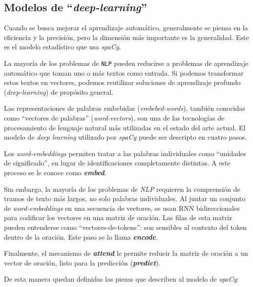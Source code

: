 \documentclass[12pt,a4paper,]{scrartcl}
\begin{document}
\hypertarget{modelos-de-deep-learning}{%
\subsection{\texorpdfstring{Modelos de \enquote{\emph{deep-learning}}}{Modelos de ``deep-learning''}}\label{modelos-de-deep-learning}}

Cuando se busca mejorar el aprendizaje automático, generalmente se piensa en la eficiencia y la precisión, pero la dimensión más importante es la generalidad. Este es el modelo estadístico que usa \emph{spaCy}.

La mayoría de los problemas de \texttt{NLP} pueden reducirse a problemas de aprendizaje automático que toman uno o más textos como entrada. Si podemos transformar estos textos en vectores, podemos reutilizar soluciones de aprendizaje profundo (\emph{deep-learning}) de propósito general.

Las representaciones de palabras embebidas (\emph{embebed-words}), también conocidas como \enquote{vectores de palabras} (\emph{word-vectors}), son una de las tecnologías de procesamiento de lenguaje natural más utilizadas en el estado del arte actual. El modelo de \emph{deep learning} utilizado por \emph{spaCy} puede ser descripto en cuatro pasos.

Los \emph{word-embeddings} permiten tratar a las palabras individuales como \enquote{unidades de significado}, en lugar de identificaciones completamente distintas. A este proceso se le conoce como \textbf{\emph{embed}}.

Sin embargo, la mayoría de los problemas de \emph{NLP} requieren la comprensión de tramos de texto más largos, no solo palabras individuales. Al juntar un conjunto de \emph{word-embeddings} en una secuencia de vectores, se usan RNN bidireccionales para codificar los vectores en una matriz de oración. Las filas de esta matriz pueden entenderse como \enquote{vectores-de-tokens}: son sensibles al contexto del token dentro de la oración. Este paso se lo llama \textbf{\emph{encode}}.

Finalmente, el mecanismo de \textbf{\emph{attend}} le permite reducir la matriz de oración a un vector de oración, listo para la predicción (\textbf{\emph{predict}}).

De esta manera quedan definidas las piezas que describen al modelo de \emph{spaCy}:
\end{document}
